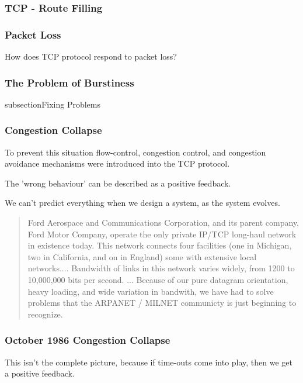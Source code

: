 \subsubsection{TCP - Route Filling}

\subsubsection{Packet Loss}

How does TCP protocol respond to packet loss?

\subsubsection{The Problem of Burstiness} 

subsection{Fixing Problems}

\subsubsection{Congestion Collapse}




To prevent this situation flow-control, congestion control, and congestion avoidance mechanisms were
introduced into the TCP protocol.

The 'wrong behaviour' can be described as a positive feedback.


We can't predict everything when we design a system, as the system evolves.

\begin{quote}
Ford Aerospace and Communications Corporation, and its parent company, Ford Motor Company, operate
    the only private IP/TCP long-haul network in existence today. This network connects four
    facilities (one in Michigan, two in California, and on in England) some with extensive local
    networks.... Bandwidth of links in this network varies widely, from 1200 to 10,000,000 bits per
    second. ... Because of our pure datagram orientation, heavy loading, and wide variation in
    bandwith, we have had to solve problems that the ARPANET / MILNET communicty is just beginning
    to recognize.
\end{quote}

\subsubsection{October 1986 Congestion Collapse}


This isn't the complete picture, because if time-outs come into play, then we get a positive
feedback.




